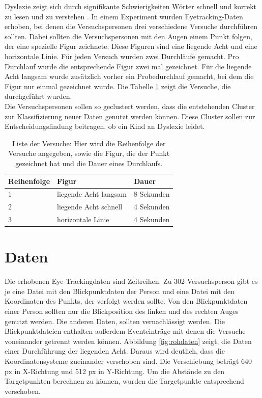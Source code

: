 \documentclass[12pt]{article}
\begin{document}
Dyslexie zeigt sich durch signiﬁkante Schwierigkeiten W\"orter schnell und korrekt zu lesen und zu verstehen \cite{Handlere818, Siegel2006}.
In einem Experiment wurden Eyetracking-Daten erhoben, bei denen die Versuchspersonen drei verschiedene Versuche durchf\"uhren sollten. Dabei sollten die Versuchspersonen mit den Augen einem Punkt folgen, der eine spezielle Figur zeichnete. Diese Figuren sind eine liegende Acht und eine horizontale Linie. F\"ur jeden Versuch wurden zwei Durchl\"aufe gemacht. Pro Durchlauf wurde die entsprechende Figur zwei mal gezeichnet. F\"ur die liegende Acht langsam wurde zus\"atzlich vorher ein Probedurchlauf gemacht, bei dem die Figur nur einmal gezeichnet wurde.
Die Tabelle \ref{tab:Versuche} zeigt die Versuche, die durchgef\"uhrt wurden.\\
Die Versuchspersonen sollen so geclustert werden, dass die entstehenden Cluster zur Klassiﬁzierung neuer Daten genutzt werden k\"onnen. Diese Cluster sollen zur Entscheidungsfindung beitragen, ob ein Kind an Dyslexie leidet.

\begin{table}[h]
	\caption{\label{tab:Versuche}Liste der Versuche: Hier wird die Reihenfolge der Versuche angegeben, sowie die Figur, die der Punkt ge\-zeich\-net hat und die Dauer eines Durchlaufs.}
	\noindent \centering{}
	\bgroup
	\def\arraystretch{2}  %
	\begin{tabular}{|l|l|l|}
		\hline
		\textbf{Reihenfolge} & \textbf{Figur} & \textbf{Dauer}\\
		\hline \hline
		1 & liegende Acht langsam & 8 Sekunden\\
		\hline
		2 & liegende Acht schnell & 4 Sekunden\\
		\hline
		3 & horizontale Linie & 4 Sekunden\\
		\hline
	\end{tabular}
	\egroup
\end{table}

\section*{Daten}
Die erhobenen Eye-Trackingdaten sind Zeitreihen. Zu 302 Versuchsperson gibt es je eine Datei mit den Blickpunktdaten der Person und eine Datei mit den Koordinaten des Punkts, der verfolgt werden sollte. Von den Blickpunktdaten einer Person sollten nur die Blickposition des linken und des rechten Auges genutzt werden. Die anderen Daten, sollten vernachl\"assigt werden. Die Blickpunktdateien enthalten au\ss{}erdem Eventeintr\"age mit denen die Versuche voneinander getrennt werden k\"onnen.
Abbildung \ref{fig:rohdaten} zeigt, die Daten einer Durchf\"uhrung der liegenden Acht. Daraus wird deutlich, dass die Koordinatensysteme zueinander verschoben sind. Die Verschiebung betr\"agt 640 px in X-Richtung und 512 px in Y-Richtung. Um die Abst\"ande zu den Targetpunkten berechnen zu k\"onnen, wurden die Targetpunkte entsprechend verschoben.
\end{document}
